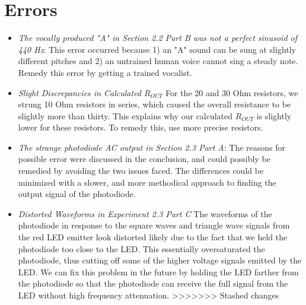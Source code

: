 \documentclass[10pt]{article}
\begin{document}
\medskip

\section{Errors}
\begin{itemize}
	\item \textit{The vocally produced "A" in Section 2.2 Part B was not a perfect sinusoid of 440 Hz}: This error occurred because 1) an "A" sound can be sung at slightly different pitches and 2) an untrained human voice cannot sing a steady note. Remedy this error by getting a trained vocalist. 
	\item \textit{Slight Discrepancies in Calculated $R_{OUT}$} For the 20 and 30 Ohm resistors, we strung 10 Ohm resistors in series, which caused the overall resistance to be slightly more than thirty. This explains why our calculated $R_{OUT}$ is slightly lower for these resistors. To remedy this, use more precise resistors. 
	\item \textit{The strange photodiode AC output in Section 2.3 Part A}: The reasons for possible error were discussed in the conclusion, and could possibly be remedied by avoiding the two issues faced. The differences could be minimized with a slower, and more methodical approach to finding the output signal of the photodiode. 
	\item \textit{Distorted Waveforms in Experiment 2.3 Part C} The waveforms of the photodiode in response to the square waves and triangle wave signals from the red LED emitter look distorted likely due to the fact that we held the photodiode too close to the LED. This essentially oversaturated the photodiode, thus cutting off some of the higher voltage signals emitted by the LED. We can fix this problem in the future by holding the LED farther from the photodiode so that the photodiode can receive the full signal from the LED without high frequency attenuation. 
>>>>>>> Stashed changes
\end{itemize}


\medskip

\
\end{document}

